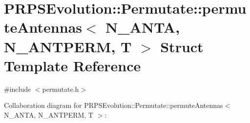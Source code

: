 \hypertarget{struct_p_r_p_s_evolution_1_1_permutate_1_1permute_antennas}{\section{P\-R\-P\-S\-Evolution\-:\-:Permutate\-:\-:permute\-Antennas$<$ N\-\_\-\-A\-N\-T\-A, N\-\_\-\-A\-N\-T\-P\-E\-R\-M, T $>$ Struct Template Reference}
\label{struct_p_r_p_s_evolution_1_1_permutate_1_1permute_antennas}
}


{\ttfamily \#include $<$permutate.\-h$>$}



Collaboration diagram for P\-R\-P\-S\-Evolution\-:\-:Permutate\-:\-:permute\-Antennas$<$ N\-\_\-\-A\-N\-T\-A, N\-\_\-\-A\-N\-T\-P\-E\-R\-M, T $>$\-:
